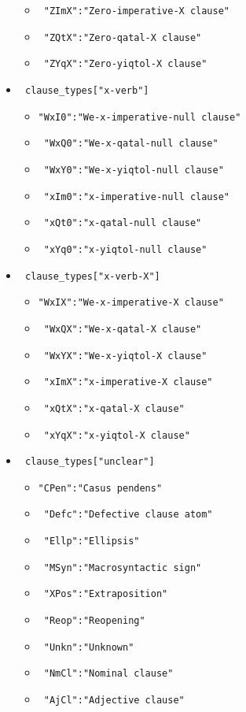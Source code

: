 \documentclass{report}
\newcommand{\mi}[1]{\lstinline{#1}}
\begin{document}
\begin{itemize}
\begin{itemize}
\item \mi{ "ZImX":"Zero-imperative-X clause"}
\item \mi{ "ZQtX":"Zero-qatal-X clause"}
\item \mi{ "ZYqX":"Zero-yiqtol-X clause"}
\end{itemize}
\item \mi{ clause_types["x-verb"]}
\begin{itemize}
\item \mi{"WxI0":"We-x-imperative-null clause"}
\item \mi{ "WxQ0":"We-x-qatal-null clause"}
\item \mi{ "WxY0":"We-x-yiqtol-null clause"}
\item \mi{ "xIm0":"x-imperative-null clause"}
\item \mi{ "xQt0":"x-qatal-null clause"}
\item \mi{ "xYq0":"x-yiqtol-null clause"}
\end{itemize}
\item \mi{ clause_types["x-verb-X"]}
\begin{itemize}
\item \mi{"WxIX":"We-x-imperative-X clause"}
\item \mi{ "WxQX":"We-x-qatal-X clause"}
\item \mi{ "WxYX":"We-x-yiqtol-X clause"}
\item \mi{ "xImX":"x-imperative-X clause"}
\item \mi{ "xQtX":"x-qatal-X clause"}
\item \mi{ "xYqX":"x-yiqtol-X clause"}
\end{itemize}
\item \mi{ clause_types["unclear"]}
\begin{itemize}
\item \mi{"CPen":"Casus pendens"}
\item \mi{ "Defc":"Defective clause atom"}
\item \mi{ "Ellp":"Ellipsis"}
\item \mi{ "MSyn":"Macrosyntactic sign"}
\item \mi{ "XPos":"Extraposition"}
\item \mi{ "Reop":"Reopening"}
\item \mi{ "Unkn":"Unknown"}
\item \mi{ "NmCl":"Nominal clause"}
\item \mi{ "AjCl":"Adjective clause"}
\end{itemize}
\end{itemize}
\end{document}
